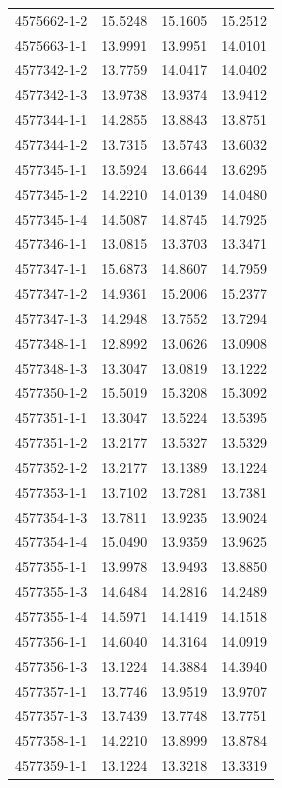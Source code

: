 \begin{longtable}{lrrr}
4575662-1-2 & 15.5248 & 15.1605 & 15.2512 \\
4575663-1-1 & 13.9991 & 13.9951 & 14.0101 \\
4577342-1-2 & 13.7759 & 14.0417 & 14.0402 \\
4577342-1-3 & 13.9738 & 13.9374 & 13.9412 \\
4577344-1-1 & 14.2855 & 13.8843 & 13.8751 \\
4577344-1-2 & 13.7315 & 13.5743 & 13.6032 \\
4577345-1-1 & 13.5924 & 13.6644 & 13.6295 \\
4577345-1-2 & 14.2210 & 14.0139 & 14.0480 \\
4577345-1-4 & 14.5087 & 14.8745 & 14.7925 \\
4577346-1-1 & 13.0815 & 13.3703 & 13.3471 \\
4577347-1-1 & 15.6873 & 14.8607 & 14.7959 \\
4577347-1-2 & 14.9361 & 15.2006 & 15.2377 \\
4577347-1-3 & 14.2948 & 13.7552 & 13.7294 \\
4577348-1-1 & 12.8992 & 13.0626 & 13.0908 \\
4577348-1-3 & 13.3047 & 13.0819 & 13.1222 \\
4577350-1-2 & 15.5019 & 15.3208 & 15.3092 \\
4577351-1-1 & 13.3047 & 13.5224 & 13.5395 \\
4577351-1-2 & 13.2177 & 13.5327 & 13.5329 \\
4577352-1-2 & 13.2177 & 13.1389 & 13.1224 \\
4577353-1-1 & 13.7102 & 13.7281 & 13.7381 \\
4577354-1-3 & 13.7811 & 13.9235 & 13.9024 \\
4577354-1-4 & 15.0490 & 13.9359 & 13.9625 \\
4577355-1-1 & 13.9978 & 13.9493 & 13.8850 \\
4577355-1-3 & 14.6484 & 14.2816 & 14.2489 \\
4577355-1-4 & 14.5971 & 14.1419 & 14.1518 \\
4577356-1-1 & 14.6040 & 14.3164 & 14.0919 \\
4577356-1-3 & 13.1224 & 14.3884 & 14.3940 \\
4577357-1-1 & 13.7746 & 13.9519 & 13.9707 \\
4577357-1-3 & 13.7439 & 13.7748 & 13.7751 \\
4577358-1-1 & 14.2210 & 13.8999 & 13.8784 \\
4577359-1-1 & 13.1224 & 13.3218 & 13.3319 \\

\end{longtable}
